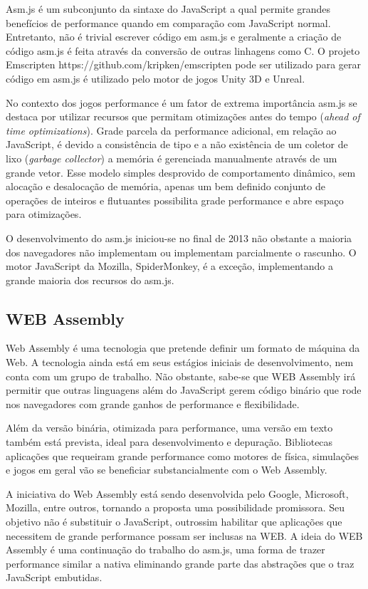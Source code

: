 Asm.js é um subconjunto da sintaxe do JavaScript a qual permite
grandes benefícios de performance quando em comparação com
JavaScript normal. Entretanto, não é trivial escrever código em
asm.js e geralmente a criação de código asm.js é feita através
da conversão de outras linhagens como C. O projeto Emscripten
https://github.com/kripken/emscripten pode ser utilizado para gerar
código em asm.js é utilizado pelo motor de jogos Unity 3D e Unreal.

No contexto dos jogos performance é um fator de extrema importância
asm.js se destaca por utilizar recursos que permitam otimizações
antes do tempo (\textit{ahead of time optimizations}). Grade parcela
da performance adicional, em relação ao JavaScript, é devido a
consistência de tipo e a não existência de um coletor de lixo
(\textit{garbage collector}) a memória é gerenciada manualmente
através de um grande vetor. Esse modelo simples desprovido de
comportamento dinâmico, sem alocação e desalocação de memória,
apenas um bem definido conjunto de operações de inteiros e flutuantes
possibilita grade performance e abre espaço para otimizações.

O desenvolvimento do asm.js iniciou-se no final de 2013 não obstante a
maioria dos navegadores não implementam ou implementam parcialmente o
rascunho. O motor JavaScript da Mozilla, SpiderMonkey, é a exceção,
implementando a grande maioria dos recursos do asm.js.

\subsection{WEB Assembly}
Web Assembly é uma tecnologia que pretende definir um formato de
máquina da Web. A tecnologia ainda está em seus estágios iniciais
de desenvolvimento, nem conta com um grupo de trabalho. Não obstante,
sabe-se que WEB Assembly irá permitir que outras linguagens além do
JavaScript gerem código binário que rode nos navegadores com grande
ganhos de performance e flexibilidade.

Além da versão binária, otimizada para performance, uma versão em
texto também está prevista, ideal para desenvolvimento e depuração.
Bibliotecas aplicações que requeiram grande performance como
motores de física, simulações e jogos em geral vão se beneficiar
substancialmente com o Web Assembly.

A iniciativa do Web Assembly está sendo desenvolvida pelo Google,
Microsoft, Mozilla, entre outros, tornando a proposta uma possibilidade
promissora. Seu objetivo não é substituir o JavaScript, outrossim
habilitar que aplicações que necessitem de grande performance possam
ser inclusas na WEB. A ideia do WEB Assembly é uma continuação
do trabalho do asm.js, uma forma de trazer performance similar a
nativa eliminando grande parte das abstrações que o traz JavaScript
embutidas.

